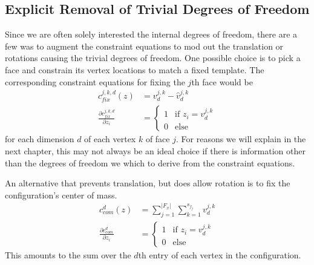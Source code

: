 \subsection{Explicit Removal of Trivial Degrees of Freedom}
\label{ssc:RemTrivDoF}
Since we are often solely interested the internal degrees of freedom, there are a few was to augment the constraint equations to mod out the translation or rotations causing the trivial degrees of freedom. One possible choice is to pick a face and constrain its vertex locations to match a fixed template. The corresponding constraint equations for fixing the $j$th face would be
\begin{align}
c_{fix}^{j,k,d}\left(z\right) &= v^{j,k}_d - \hat{v}^{j,k}_d \\
	\frac{\partial c_{fix}^{j,k,d}}{\partial z_i} &=
  	\begin{cases}
        	1 	& \text{if } z_i = v^{j,k}_d \\
   		0       & \text{else} 
  	\end{cases} 
\end{align}
for each dimension $d$ of each vertex $k$ of face $j$. For reasons we will explain in the next chapter, this may not always be an ideal choice if there is information other than the degrees of freedom we which to derive from the constraint equations.


An alternative that prevents translation, but does allow rotation is to fix the configuration's center of mass. 
\begin{align}
c_{com}^{d}\left(z\right) &= \sum_{j = 1}^{|F_x|}\sum_{k=1}^{s_{f_j}}v^{j,k}_d \\
	\frac{\partial c_{com}^{d}}{\partial z_i} &=
  	\begin{cases}
        	1 	& \text{if } z_i = v^{j,k}_d \\
   		0       & \text{else} 
  	\end{cases} 
\end{align}
This amounts to the sum over the $d$th entry of each vertex in the configuration.



